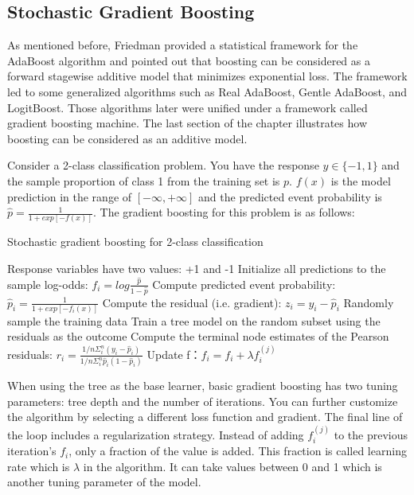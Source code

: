 \documentclass[
  12pt,
]{krantz}
\begin{document}
\hypertarget{stochastic-gradient-boosting}{%
\subsection{Stochastic Gradient Boosting}\label{stochastic-gradient-boosting}}

As mentioned before, Friedman \citep{Friedman2000} provided a statistical framework for the AdaBoost algorithm and pointed out that boosting can be considered as a forward stagewise additive model that minimizes exponential loss. The framework led to some generalized algorithms such as Real AdaBoost, Gentle AdaBoost, and LogitBoost. Those algorithms later were unified under a framework called gradient boosting machine. The last section of the chapter illustrates how boosting can be considered as an additive model.

Consider a 2-class classification problem. You have the response \(y \in \{-1, 1\}\) and the sample proportion of class 1 from the training set is \(p\). \(f(x)\) is the model prediction in the range of \([-\infty, +\infty]\) and the predicted event probability is \(\hat{p}=\frac{1}{1+exp[-f(x)]}\). The gradient boosting for this problem is as follows:

\begin{algorithm}
\caption{Stochastic gradient boosting for 2-class classification}\label{gbmalgorithm} 
\begin{algorithmic}[1] 
\State Response variables have two values: +1 and -1
\State Initialize all  predictions to the sample log-odds: $f_{i} = log \frac{\hat{p}}{1- \hat{p}}$
    \State Compute predicted event probability:  $\hat{p}_i=\frac{1}{1+exp[-f_{i}(x)]}$
    \State Compute the residual (i.e. gradient): $z_i=y_i-\hat{p}_i$
    \State Randomly sample the training data
    \State Train a tree model on the random subset using the residuals as the outcome
    \State Compute the terminal node estimates of the Pearson residuals: $r_i=\frac{1/n\Sigma_i^n(y_i-\hat{p}_i)}{1/n\Sigma_i^n\hat{p}_i(1-\hat{p}_i)}$
    \State Update f：$f_i=f_i+\lambda f_i^{(j)}$
\EndFor
\end{algorithmic}
\end{algorithm}

When using the tree as the base learner, basic gradient boosting has two tuning parameters: tree depth and the number of iterations. You can further customize the algorithm by selecting a different loss function and gradient\citep{Hastie2008}. The final line of the loop includes a regularization strategy. Instead of adding \(f_i^{(j)}\) to the previous iteration's \(f_i\), only a fraction of the value is added. This fraction is called learning rate which is \(\lambda\) in the algorithm. It can take values between 0 and 1 which is another tuning parameter of the model.
\end{document}
